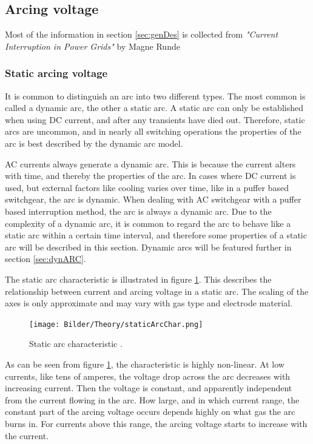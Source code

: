 \documentclass[10pt,b5paper,twoside]{article}
\begin{document}
\subsection{Arcing voltage}
Most of the information in section \ref{sec:genDes} is collected from \textit{"Current Interruption in Power Grids"} by Magne Runde \cite{bib:HVEbreak} \newline

\subsubsection{Static arcing voltage}
It is common to distinguish an arc into two different types. The most common is called a dynamic arc, the other a static arc. A static arc can only be established when using DC current, and after any transients have died out. Therefore, static arcs are uncommon, and in nearly all switching operations the properties of the arc is best described by the dynamic arc model.

AC currents always generate a dynamic arc. This is because the current alters with time, and thereby the properties of the arc. In cases where DC current is used, but external factors like cooling varies over time, like in a puffer based switchgear, the arc is dynamic. When dealing with AC switchgear with a puffer based interruption method, the arc is always a dynamic arc. Due to the complexity of a dynamic arc, it is common to regard the arc to behave like a static arc within a certain time interval, and therefore some properties of a static arc will be described in this section. Dynamic arcs will be featured further in section \ref{sec:dynARC}.

The static arc characteristic is illustrated in figure \ref{fig:staticArcChar}. This describes the relationship between current and arcing voltage in a static arc. The scaling of the axes is only approximate and may vary with gas type and electrode material.

\begin{figure}[H]
\centering
\texttt{[image: Bilder/Theory/staticArcChar.png]}
\caption{Static arc characteristic  \cite{bib:HVEbreak}.} \label{fig:staticArcChar}
\end{figure}

As can be seen from figure \ref{fig:staticArcChar}, the characteristic is highly non-linear. At low currents, like tens of amperes, the voltage drop across the arc decreases with increasing current. Then the voltage is constant, and apparently independent from the current flowing in the arc. How large, and in which current range, the constant part of the arcing voltage occurs depends highly on what gas the arc burns in. For currents above this range, the arcing voltage starts to increase with the current.
\end{document}
